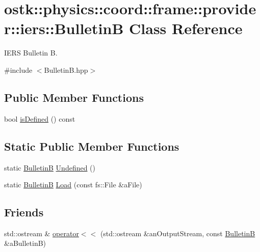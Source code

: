 \hypertarget{classostk_1_1physics_1_1coord_1_1frame_1_1provider_1_1iers_1_1_bulletin_b}{}\section{ostk\+:\+:physics\+:\+:coord\+:\+:frame\+:\+:provider\+:\+:iers\+:\+:BulletinB Class Reference}
\label{classostk_1_1physics_1_1coord_1_1frame_1_1provider_1_1iers_1_1_bulletin_b}


I\+E\+RS Bulletin B.  




{\ttfamily \#include $<$Bulletin\+B.\+hpp$>$}

\subsection*{Public Member Functions}
\begin{DoxyCompactItemize}
\item 
bool \hyperlink{classostk_1_1physics_1_1coord_1_1frame_1_1provider_1_1iers_1_1_bulletin_b_ab90d582229f254830583cd9ce65d8dab}{is\+Defined} () const
\end{DoxyCompactItemize}
\subsection*{Static Public Member Functions}
\begin{DoxyCompactItemize}
\item 
static \hyperlink{classostk_1_1physics_1_1coord_1_1frame_1_1provider_1_1iers_1_1_bulletin_b}{BulletinB} \hyperlink{classostk_1_1physics_1_1coord_1_1frame_1_1provider_1_1iers_1_1_bulletin_b_acb41581b3948a93fca9968a3f3750711}{Undefined} ()
\item 
static \hyperlink{classostk_1_1physics_1_1coord_1_1frame_1_1provider_1_1iers_1_1_bulletin_b}{BulletinB} \hyperlink{classostk_1_1physics_1_1coord_1_1frame_1_1provider_1_1iers_1_1_bulletin_b_ae28b57329f192b329fe38476f4f026b5}{Load} (const fs\+::\+File \&a\+File)
\end{DoxyCompactItemize}
\subsection*{Friends}
\begin{DoxyCompactItemize}
\item 
std\+::ostream \& \hyperlink{classostk_1_1physics_1_1coord_1_1frame_1_1provider_1_1iers_1_1_bulletin_b_a36d9e78a5de0361186ca1cb63ab6f1ee}{operator$<$$<$} (std\+::ostream \&an\+Output\+Stream, const \hyperlink{classostk_1_1physics_1_1coord_1_1frame_1_1provider_1_1iers_1_1_bulletin_b}{BulletinB} \&a\+BulletinB)
\end{DoxyCompactItemize}


